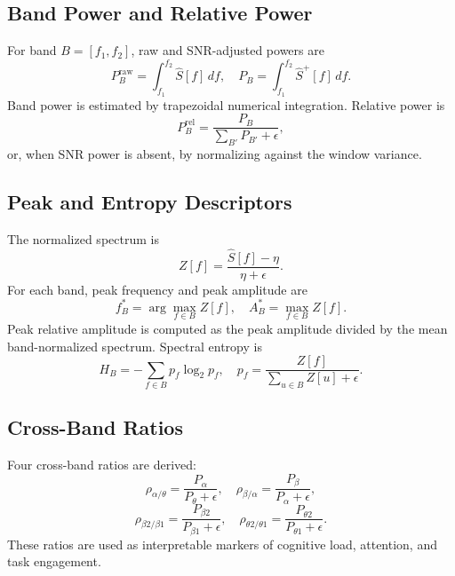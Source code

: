 \documentclass[conference]{IEEEtran}
\begin{document}
\subsection{Band Power and Relative Power}
For band $B=[f_1,f_2]$, raw and SNR-adjusted powers are
\begin{equation}
P_B^{\mathrm{raw}}=\int_{f_1}^{f_2}\hat{S}[f]\,df,\quad
P_B=\int_{f_1}^{f_2}\hat{S}^{+}[f]\,df .
\end{equation}
Band power is estimated by trapezoidal numerical integration. Relative power is
\begin{equation}
P_B^{\mathrm{rel}}=\frac{P_B}{\sum_{B'}P_{B'}+\epsilon},
\end{equation}
or, when SNR power is absent, by normalizing against the window variance.

\subsection{Peak and Entropy Descriptors}
The normalized spectrum is
\begin{equation}
Z[f]=\frac{\hat{S}[f]-\eta}{\eta+\epsilon}.
\end{equation}
For each band, peak frequency and peak amplitude are
\begin{equation}
f_B^\ast=\arg\max_{f\in B} Z[f],\quad A_B^\ast=\max_{f\in B} Z[f].
\end{equation}
Peak relative amplitude is computed as the peak amplitude divided by the mean band-normalized spectrum. Spectral entropy is
\begin{equation}
H_B=-\sum_{f\in B}p_f\log_2p_f,\quad
p_f=\frac{Z[f]}{\sum_{u\in B}Z[u]+\epsilon}.
\end{equation}

\subsection{Cross-Band Ratios}
Four cross-band ratios are derived:
\begin{equation}
\rho_{\alpha/\theta}=\frac{P_\alpha}{P_\theta+\epsilon},\quad
\rho_{\beta/\alpha}=\frac{P_\beta}{P_\alpha+\epsilon},
\end{equation}
\begin{equation}
\rho_{\beta2/\beta1}=\frac{P_{\beta2}}{P_{\beta1}+\epsilon},\quad
\rho_{\theta2/\theta1}=\frac{P_{\theta2}}{P_{\theta1}+\epsilon}.
\end{equation}
These ratios are used as interpretable markers of cognitive load, attention, and task engagement.
\end{document}
